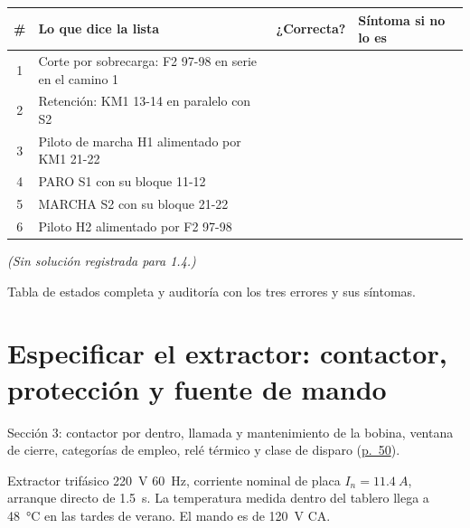 \documentclass[11pt,a4paper]{article}
\makeatletter
\newif\ifdocente
\newcommand{\solucion}[1]{%
  \ifdocente
    \ifcsname sol@#1\endcsname
      \begin{solucionbox}\small\csname sol@#1\endcsname\end{solucionbox}%
    \else
      \begin{solucionbox}\small\textit{(Sin solución registrada para #1.)}\end{solucionbox}%
    \fi
  \fi}
\newcommand{\pdfpag}[1]{\href{https://github.com/marcoteran/atsep-energy-control-labs/raw/refs/heads/master/presentaciones/marcoteran_energy_electriccontroland_wiredlogyc.pdf\#page=#1}{p.~#1}}
\newcommand{\renglon}{\rule[-0.42cm]{0pt}{1.1cm}}
\makeatother
\begin{document}
\begin{center}\small\renewcommand{\arraystretch}{1.4}
\begin{tabularx}{\linewidth}{@{}c p{6.2cm} >{\centering\arraybackslash\renglon}p{1.7cm} W@{}}
\toprule
\textbf{\#} & \textbf{Lo que dice la lista} & \textbf{¿Correcta?} & \textbf{Síntoma si no lo es}\\
 & Corte por sobrecarga: F2 97-98 en serie en el camino 1 & & \\
2 & Retención: KM1 13-14 en paralelo con S2 & & \\
3 & Piloto de marcha H1 alimentado por KM1 21-22 & & \\
4 & PARO S1 con su bloque 11-12 & & \\
5 & MARCHA S2 con su bloque 21-22 & & \\
6 & Piloto H2 alimentado por F2 97-98 & & \\
\bottomrule
\end{tabularx}
\end{center}
\solucion{1.4}

\begin{evidencia}
Tabla de estados completa y auditoría con los tres errores y sus síntomas.
\end{evidencia}

\section{Especificar el extractor: contactor, protección y fuente de mando}

\begin{curso}
Sección 3: contactor por dentro, llamada y mantenimiento de la bobina, ventana de cierre, categorías de empleo, relé térmico y clase de disparo (\pdfpag{50}).
\end{curso}

\begin{datos}
Extractor trifásico \SI{220}{V} \SI{60}{Hz}, corriente nominal de placa $I_n = \SI{11,4}{A}$, arranque directo de \SI{1,5}{s}. La temperatura medida dentro del tablero llega a \SI{48}{\celsius} en las tardes de verano. El mando es de \SI{120}{V} CA.
\end{datos}
\end{document}
